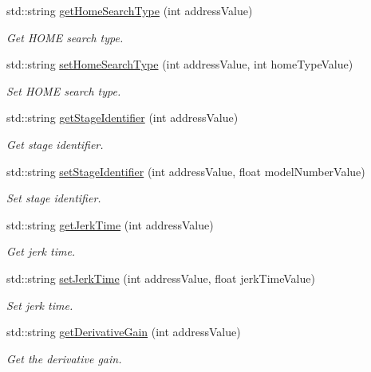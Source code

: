 \begin{DoxyCompactItemize}
std\+::string \hyperlink{namespaceconex_ad1b0c2c8ee173f299589772d4c2fd3b2}{get\+Home\+Search\+Type} (int address\+Value)
\begin{DoxyCompactList}\small\item\em Get H\+O\+ME search type. \end{DoxyCompactList}\item 
std\+::string \hyperlink{namespaceconex_a2b7cd3e7462a4a8f2ba9e48ea5b5c450}{set\+Home\+Search\+Type} (int address\+Value, int home\+Type\+Value)
\begin{DoxyCompactList}\small\item\em Set H\+O\+ME search type. \end{DoxyCompactList}\item 
std\+::string \hyperlink{namespaceconex_ad9475bdc92877f316a2e3db9ff0e8fb1}{get\+Stage\+Identifier} (int address\+Value)
\begin{DoxyCompactList}\small\item\em Get stage identifier. \end{DoxyCompactList}\item 
std\+::string \hyperlink{namespaceconex_a81886be7ef4e25e26a4a222d4716ea7f}{set\+Stage\+Identifier} (int address\+Value, float model\+Number\+Value)
\begin{DoxyCompactList}\small\item\em Set stage identifier. \end{DoxyCompactList}\item 
std\+::string \hyperlink{namespaceconex_acef19de1c3d630503736cf1bf20d4dbc}{get\+Jerk\+Time} (int address\+Value)
\begin{DoxyCompactList}\small\item\em Get jerk time. \end{DoxyCompactList}\item 
std\+::string \hyperlink{namespaceconex_aa3f88891fb93e706d4be157b584a7f42}{set\+Jerk\+Time} (int address\+Value, float jerk\+Time\+Value)
\begin{DoxyCompactList}\small\item\em Set jerk time. \end{DoxyCompactList}\item 
std\+::string \hyperlink{namespaceconex_a30cba542f0ebd8eea74032431fb29d21}{get\+Derivative\+Gain} (int address\+Value)
\begin{DoxyCompactList}\small\item\em Get the derivative gain. \end{DoxyCompactList}\item 

\end{DoxyCompactItemize}

